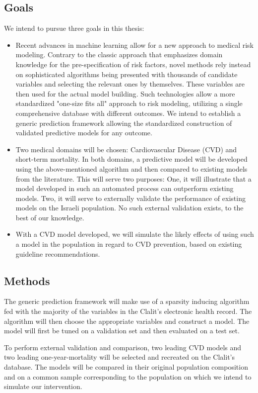 \documentclass[a4paper,12pt]{article}
\begin{document}
		\subsection{Goals}
		We intend to pursue three goals in this thesis:
		\begin{itemize}
			\item Recent advances in machine learning allow for a new approach to medical risk modeling\cite{Obermeyer2016}. Contrary to the classic approach that emphasizes domain knowledge for the pre-specification of risk factors, novel methods rely instead on sophisticated algorithms being presented with thousands of candidate variables and selecting the relevant ones by themselves. These variables are then used for the actual model building\cite{Weng2017}. Such technologies allow a more standardized "one-size fits all" approach to risk modeling, utilizing a single comprehensive database with different outcomes\cite{Rajkomar2018}. We intend to establish a generic prediction framework allowing the standardized construction of validated predictive models for any outcome.
			\item Two medical domains will be chosen: Cardiovascular Disease (CVD) and short-term mortality. In both domains, a predictive model will be developed using the above-mentioned algorithm and then compared to existing models from the literature. This will serve two purposes: One, it will illustrate that a model developed in such an automated process can outperform existing models. Two, it will serve to externally validate the performance of existing models on the Israeli population. No such external validation exists, to the best of our knowledge.
			\item With a CVD model developed, we will simulate the likely effects of using such a model in the population in regard to CVD prevention, based on existing guideline recommendations\cite{Goff2014}.
		\end{itemize}
	
		\subsection{Methods}
		The generic prediction framework will make use of a sparsity inducing algorithm fed with the majority of the variables in the Clalit's electronic health record. The algorithm will then choose the appropriate variables and construct a model. The model will first be tuned on a validation set and then evaluated on a test set.
		
		To perform external validation and comparison, two leading CVD models and two leading one-year-mortality will be selected and recreated on the Clalit's database. The models will be compared in their original population composition and on a common sample corresponding to the population on which we intend to simulate our intervention.
		
\end{document}
